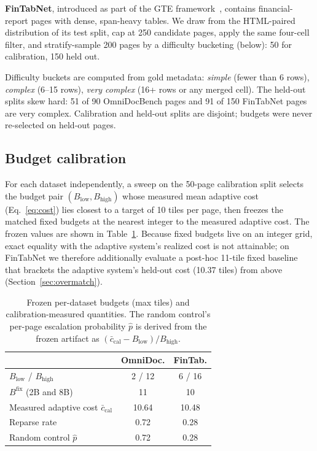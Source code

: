 \documentclass[conference]{IEEEtran}
\begin{document}
\textbf{FinTabNet}, introduced as part of the GTE framework~\cite{zheng2021fintabnet}, contains financial-report
pages with dense, span-heavy tables. We draw from the HTML-paired
distribution of its test split, cap at 250 candidate pages, apply the
same four-cell filter, and stratify-sample 200 pages by a difficulty
bucketing (below): 50 for calibration, 150 held out.

Difficulty buckets are computed from gold metadata: \emph{simple} (fewer
than 6 rows), \emph{complex} (6--15 rows), \emph{very complex} (16+ rows
or any merged cell). The held-out splits skew hard: 51 of 90 OmniDocBench
pages and 91 of 150 FinTabNet pages are very complex. Calibration and
held-out splits are disjoint; budgets were never re-selected on held-out
pages.

\subsection{Budget calibration}
\label{sec:calibration}

For each dataset independently, a sweep on the 50-page calibration split
selects the budget pair $(B_{\mathrm{low}}, B_{\mathrm{high}})$ whose
measured mean adaptive cost (Eq.~\ref{eq:cost}) lies closest to a target
of 10 tiles per page, then freezes the matched fixed budgets at the
nearest integer to the measured adaptive cost. The frozen values are
shown in Table~\ref{tab:budgets}. Because fixed budgets live on an
integer grid, exact equality with the adaptive system's realized cost is
not attainable; on FinTabNet we therefore additionally evaluate a
post-hoc 11-tile fixed baseline that brackets the adaptive system's
held-out cost (10.37 tiles) from above
(Section~\ref{sec:overmatch}).

\begin{table}[t]
  \centering
  \caption{Frozen per-dataset budgets (max tiles) and
  calibration-measured quantities. The random control's per-page
  escalation probability $\hat{p}$ is derived from the frozen artifact as
  $(\bar{c}_{\mathrm{cal}} - B_{\mathrm{low}})/B_{\mathrm{high}}$.}
  \label{tab:budgets}
  \footnotesize
  \setlength{\tabcolsep}{4pt}
  \begin{tabular}{lcc}
  \toprule
   & OmniDoc. & FinTab. \\
  \midrule
  $B_{\mathrm{low}}$ / $B_{\mathrm{high}}$ & 2 / 12 & 6 / 16 \\
  $B^{\mathrm{fix}}$ (2B and 8B)           & 11     & 10 \\
  Measured adaptive cost $\bar{c}_{\mathrm{cal}}$ & 10.64 & 10.48 \\
  Reparse rate                             & 0.72   & 0.28 \\
  Random control $\hat{p}$                 & 0.72   & 0.28 \\
  \bottomrule
  \end{tabular}
\end{table}
\end{document}
